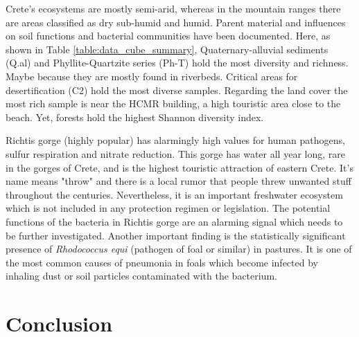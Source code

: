 Crete's ecosystems are mostly semi-arid, whereas in the mountain ranges there 
are areas classified as dry sub-humid and humid. Parent material and influences
on soil functions and bacterial communities have been documented. Here, as shown in Table \ref{table:data_cube_summary},
Quaternary-alluvial sediments (Q.al) and Phyllite-Quartzite series (Ph-T) hold the most diversity 
and richness. Maybe because they are mostly found in riverbeds. Critical areas for 
desertification (C2) hold the most diverse samples. Regarding the land cover the most
rich sample is near the HCMR building, a high touristic area close to the beach. Yet, forests
hold the highest Shannon diversity index.

Richtis gorge (highly popular) has alarmingly high values for human pathogens, sulfur respiration and
nitrate reduction. This gorge has water all year long, rare in the gorges of Crete,
and is the highest touristic attraction of eastern Crete. It's name means "throw" and 
there is a local rumor that people threw unwanted stuff throughout the centuries. 
Nevertheless, it is an important freshwater ecosystem which is not included in 
any protection regimen or legislation.
The potential functions of the bacteria in Richtis gorge are an alarming signal which needs to be further investigated.
Another important finding is the statistically significant presence of \textit{Rhodococcus equi} (pathogen of foal or similar)
in pastures. It is one of the most common causes of pneumonia in foals which
become infected by inhaling dust or soil particles contaminated with the bacterium.

\section{Conclusion}

